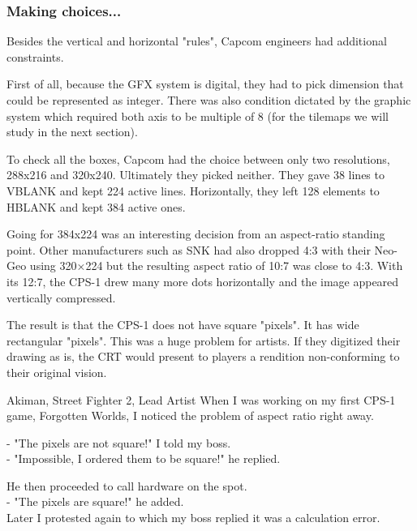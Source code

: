 \subsubsection{Making choices...}
Besides the vertical and horizontal "rules", Capcom engineers had additional constraints.

First of all, because the GFX system is digital, they had to pick dimension that could be represented as integer. There was also condition dictated by the graphic system which required both axis to be multiple of 8 (for the tilemaps we will study in the next section).

To check all the boxes, Capcom had the choice between only two resolutions, 288x216 and 320x240. Ultimately they picked neither. They gave 38 lines to VBLANK and kept 224 active lines\cite{petitCRT}. Horizontally, they left 128 elements to HBLANK and kept 384 active ones.  

Going for 384x224 was an interesting decision from an aspect-ratio standing point. Other manufacturers such as SNK had also dropped 4:3 with their Neo-Geo using 320×224 but the resulting aspect ratio of 10:7 was close to 4:3. With its 12:7, the CPS-1 drew many more dots horizontally and the image appeared vertically compressed. 




The result is that the CPS-1 does not have square "pixels". It has wide rectangular "pixels". This was a huge problem for artists. If they digitized their drawing as is, the CRT would present to players a rendition non-conforming to their original vision.


\begin{q}{Akiman, Street Fighter 2, Lead Artist\cite{akiman}}
When I was working on my first CPS-1 game, Forgotten Worlds, I noticed the problem of aspect ratio right away. 

- "The pixels are not square!" I told my boss.\\ 
- "Impossible, I ordered them to be square!" he replied.

He then proceeded to call hardware on the spot.\\ 
- "The pixels are square!" he added.\\
Later I protested again to which my boss replied it was a calculation error.
\end{q}

